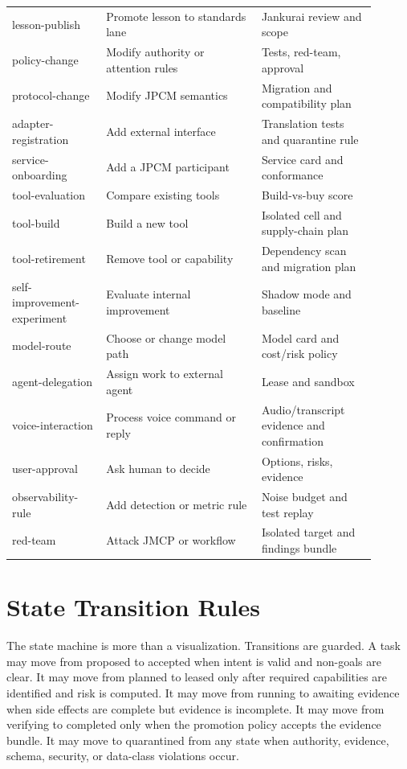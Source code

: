 \documentclass[10pt,journal,onecolumn]{IEEEtran}
\begin{document}
\begin{longtable}{p{0.23\linewidth}p{0.38\linewidth}p{0.29\linewidth}}
lesson-publish & Promote lesson to standards lane & Jankurai review and scope\\
policy-change & Modify authority or attention rules & Tests, red-team, approval\\
protocol-change & Modify JPCM semantics & Migration and compatibility plan\\
adapter-registration & Add external interface & Translation tests and quarantine rule\\
service-onboarding & Add a JPCM participant & Service card and conformance\\
tool-evaluation & Compare existing tools & Build-vs-buy score\\
tool-build & Build a new tool & Isolated cell and supply-chain plan\\
tool-retirement & Remove tool or capability & Dependency scan and migration plan\\
self-improvement-experiment & Evaluate internal improvement & Shadow mode and baseline\\
model-route & Choose or change model path & Model card and cost/risk policy\\
agent-delegation & Assign work to external agent & Lease and sandbox\\
voice-interaction & Process voice command or reply & Audio/transcript evidence and confirmation\\
user-approval & Ask human to decide & Options, risks, evidence\\
observability-rule & Add detection or metric rule & Noise budget and test replay\\
red-team & Attack JMCP or workflow & Isolated target and findings bundle\\
\bottomrule
\end{longtable}

\section{State Transition Rules}
The state machine is more than a visualization. Transitions are guarded. A task may move from proposed to accepted when intent is valid and non-goals are clear. It may move from planned to leased only after required capabilities are identified and risk is computed. It may move from running to awaiting evidence when side effects are complete but evidence is incomplete. It may move from verifying to completed only when the promotion policy accepts the evidence bundle. It may move to quarantined from any state when authority, evidence, schema, security, or data-class violations occur.
\end{document}
